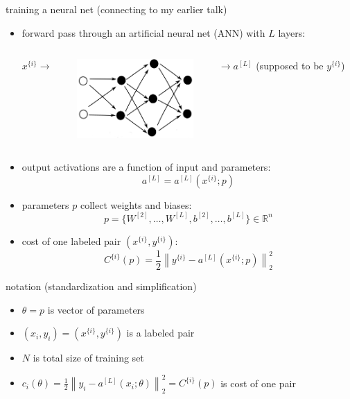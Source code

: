 \documentclass[xcolor={svgnames},
               hyperref={colorlinks,citecolor=DeepPink4,linkcolor=FireBrick,urlcolor=Maroon}]
               {beamer}
\newcommand{\RR}{\mathbb{R}}
\begin{document}
\begin{frame}{training a neural net (connecting to my earlier talk)}

\begin{itemize}
\item forward pass through an artificial neural net (ANN) with $L$ layers:

\begin{columns}
\begin{column}{0.1\textwidth}
$x^{\{i\}}\to$ 
\end{column}
\begin{column}{0.4\textwidth}
\includegraphics[height=30mm]{figs/cleannet.png}
\end{column}
\begin{column}{0.45\textwidth}
$\to a^{[L]}$ \hfill (supposed to be $y^{\{i\}}$)
\end{column}
\end{columns}

\item output activations are a function of input and parameters:
    $$a^{[L]} = a^{[L]}(x^{\{i\}}; p)$$
\item parameters $p$ collect weights and biases:
    $$p=\{W^{[2]},\dots,W^{[L]},b^{[2]},\dots,b^{[L]}\} \in \RR^n$$
\item cost of one labeled pair $(x^{\{i\}},y^{\{i\}})$:
    $$C^{\{i\}}(p) = \frac{1}{2} \left\|y^{\{i\}} - a^{[L]}(x^{\{i\}}; p)\right\|_2^2$$
\end{itemize}
\end{frame}


\begin{frame}{notation (standardization and simplification)}

\begin{itemize}
\item $\theta = p$ is vector of parameters
\item $(x_i,y_i) = (x^{\{i\}},y^{\{i\}})$ is a labeled pair
\item $N$ is total size of training set
\item $c_i(\theta) = \frac{1}{2} \left\|y_i - a^{[L]}(x_i; \theta)\right\|_2^2 = C^{\{i\}}(p)$ is cost of one pair
\end{itemize}
\end{frame}
\end{document}
